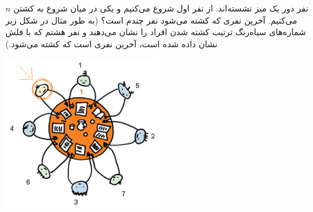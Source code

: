 \EXERCISE
$n$
نفر دور یک میز نشسته‌اند. از نفر اول شروع می‌کنیم و یکی در میان شروع به کشتن می‌کنیم. آخرین نفری که کشته می‌شود نفر چندم است؟ (به طور مثال در شکل زیر شماره‌های سیاه‌رنگ ترتیب کشته شدن افراد را نشان می‌دهند و نفر هشتم که با فلش نشان داده شده است، آخرین نفری است که کشته می‌شود.)
\begin{center}
\includegraphics[height=6.5cm]{18.png}
\end{center}